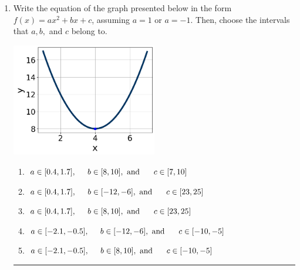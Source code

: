 \documentclass[14pt]{extbook}
\newcommand{\litem}[1]{\item#1\hspace*{-1cm}\rule{\textwidth}{0.4pt}}
\begin{document}
\begin{enumerate}
{\begin{enumerate}[label=\Alph*.]
\end{enumerate} }
\litem{
Write the equation of the graph presented below in the form $f(x)=ax^2+bx+c$, assuming  $a=1$ or $a=-1$. Then, choose the intervals that $a, b,$ and $c$ belong to.
\begin{center}
    \includegraphics[width=0.5\textwidth]{../Figures/quadraticGraphToEquationCopyC.png}
\end{center}
\begin{enumerate}[label=\Alph*.]
\item \( a \in [0.4, 1.7], \hspace*{5mm} b \in [8, 10], \text{ and } \hspace*{5mm} c \in [7, 10] \)
\item \( a \in [0.4, 1.7], \hspace*{5mm} b \in [-12, -6], \text{ and } \hspace*{5mm} c \in [23, 25] \)
\item \( a \in [0.4, 1.7], \hspace*{5mm} b \in [8, 10], \text{ and } \hspace*{5mm} c \in [23, 25] \)
\item \( a \in [-2.1, -0.5], \hspace*{5mm} b \in [-12, -6], \text{ and } \hspace*{5mm} c \in [-10, -5] \)
\item \( a \in [-2.1, -0.5], \hspace*{5mm} b \in [8, 10], \text{ and } \hspace*{5mm} c \in [-10, -5] \)


\end{enumerate}}
\end{enumerate}
\end{document}
